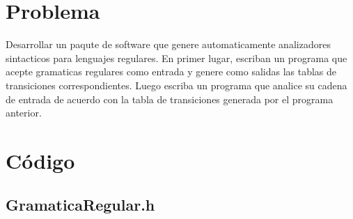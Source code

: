 \documentclass[a4paper,12pt]{article}
\begin{document}
   \section{Problema}
   Desarrollar un paqute de software que genere automaticamente analizadores sintacticos para lenguajes regulares. En primer lugar, escriban un programa que acepte gramaticas regulares como entrada y genere como salidas las tablas de transiciones correspondientes. Luego escriba un programa que analice su cadena de entrada de acuerdo con la tabla de transiciones generada por el programa anterior.
   \section{Código}
    \subsection{GramaticaRegular.h}
\end{document}
